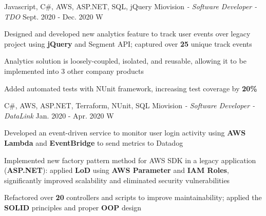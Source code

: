 \begin{siderules}
  \begin{cventries}
    \cventry
    {Javascript, C\#, AWS, ASP.NET, SQL, jQuery}
    {Miovision\hspace{0.15em} \bodyfontlight\itshape{- Software Developer - TDO}}
    {Sept. 2020 - Dec. 2020}
    {W}
    {
      \begin{cvitems}
        \item {Designed and developed new analytics feature to track user events over legacy project using \textbf{jQuery} and Segment API; captured over \textbf{25} unique track events}
        \item {Analytics solution is loosely-coupled, isolated, and reusable, allowing it to be implemented into 3 other company products}
        \item {Added automated tests with NUnit framework, increasing test coverage by \textbf{20\%}}
      \end{cvitems}
    }
    \cventry
    {C\#, AWS, ASP.NET, Terraform, NUnit, SQL}
    {Miovision\hspace{0.15em} \bodyfontlight\itshape{- Software Developer - DataLink}}
    {Jan. 2020 - Apr. 2020}
    {W}
    {
      \begin{cvitems}
        \item {Developed an event-driven service to monitor user login activity using \textbf{AWS Lambda} and \textbf{EventBridge} to send metrics to Datadog}
        \item {Implemented new factory pattern method for AWS SDK in a legacy application (\textbf{ASP.NET}): applied \textbf{LoD} using \textbf{AWS Parameter} and \textbf{IAM Roles}, significantly improved scalability and eliminated security vulnerabilities}
        \item {Refactored over \textbf{20} controllers and scripts to improve maintainability; applied the \textbf{SOLID} principles and proper \textbf{OOP} design}

\end{cvitems}}
\end{cventries}
\end{siderules}
